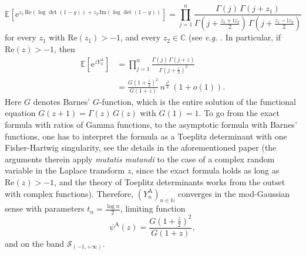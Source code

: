 \documentclass[12pt,a4paper,reqno]{amsart}
\theoremstyle{remark}
\newcommand{\N}{\mathbb{N}}
\newcommand{\C}{\mathbb{C}}
\newcommand{\E}{\mathrm{e}}
\newcommand{\I}{\mathrm{i}}
\newcommand{\esper}{\mathbb{E}}
\renewcommand{\Re}{\mathrm{Re}}
\begin{document}
$$\esper\!\left[\E^{z_1\,\Re(\log \det(1-g)) +z_2\,\mathrm{Im}(\log \det(1-g))}\right] = \prod_{j=1}^n \frac{\Gamma(j)\,\Gamma(j+z_1)}{\Gamma(j+\frac{z_1+\I z_2}{2}) \,\Gamma(j+\frac{z_1-\I z_2}{2} )}$$
for every $z_1$ with $\Re(z_1)>-1$, and every $z_2 \in \C$ (see \emph{e.g.} \cite[Formula (71)]{KS1}. In particular, if $\Re(z)>-1$, then
\begin{align*}
\esper\!\left[\E^{z Y_n^{\mathrm{A}}}\right] &= \prod_{j=1}^n \frac{\Gamma(j)\,\Gamma(j+z)}{\Gamma(j+\frac{z}{2})^2} \\
&= \frac{G(1+\frac{z}{2})^2}{G(1+z)}\,n^{\frac{z^2}{4}}\,(1+o(1)).
\end{align*}
Here $G$ denotes Barnes' $G$-function, which is the entire solution of the functional equation $G(z+1)=\Gamma(z)\,G(z)$ with $G(1)=1$. To go from the exact formula with ratios of Gamma functions, to the asymptotic formula with Barnes' functions, one has to interpret the formula as a Toeplitz determinant with one Fisher-Hartwig singularity, see the details in the aforementioned paper \cite{KN12} (the arguments therein apply \emph{mutatis mutandi} to the case of a complex random variable in the Laplace transform $z$, since the exact formula holds as long as $\Re(z)>-1$, and the theory of Toeplitz determinants works from the outset with complex functions). Therefore, $(Y_n^{\mathrm{A}})_{n \in \N}$ converges in the mod-Gaussian sense with parameters $t_n=\frac{\log n}{2}$, limiting function
$$\psi^{\mathrm{A}}(z)= \frac{G(1+\frac{z}{2})^2}{G(1+z)},$$
and on the band $\mathcal{S}_{(-1,+\infty)}$.\bigskip
\end{document}
